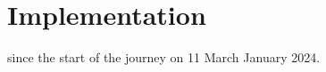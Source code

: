 \chapter{Implementation}
\setcounter{section}{0}

 since the start of the journey on 11 March January 2024.
